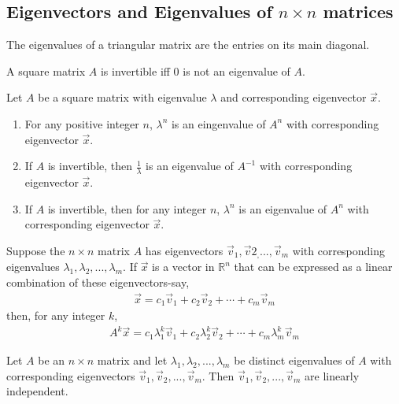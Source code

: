 \documentclass{article}
\begin{document}
\subsection{Eigenvectors and Eigenvalues of $n\times n$ matrices}
\setcounter{theorem}{14}
\begin{theorem}
	The eigenvalues of a triangular matrix are the entries on its main diagonal.
\end{theorem}
\begin{theorem}
	A square matrix $A$ is invertible iff $0$ is not an eigenvalue of $A$.
\end{theorem}
\setcounter{theorem}{17}
\begin{theorem}
	Let $A$ be a square matrix with eigenvalue $\lambda$ and corresponding eigenvector $\vec x$.
	\begin{enumerate}
		\item For any positive integer $n$, $\lambda^n$ is an eingenvalue of $A^n$ with corresponding eigenvector $\vec x$.
		\item If $A$ is invertible, then $\frac{1}{\lambda}$ is an eigenvalue of $A^{-1}$ with corresponding eigenvector $\vec x$.
		\item If $A$ is invertible, then for any integer $n$, $\lambda^n$ is an eigenvalue of $A^n$ with corresponding eigenvector $\vec x$.
	\end{enumerate}
\end{theorem}
\begin{theorem}
	Suppose the $n\times n$ matrix $A$ has eigenvectors $\vec v_1, \vec v2_, ..., \vec v_m$ with corresponding eigenvalues $\lambda_1, \lambda_2, ...,\lambda_m$. If $\vec x$ is a vector in $\mathbb{R}^n$ that can be expressed as a linear combination of these eigenvectors-say,
	\begin{align*}
		\vec x = c_1\vec v_1+c_2\vec v_2 +\cdots + c_m\vec v_m
	\end{align*}
	then, for any integer $k$,
	\begin{align*}
		A^k\vec x = c_1\lambda_1^k\vec v_1+c_2\lambda_2^k\vec v_2 + \cdots + c_m\lambda_m^k\vec v_m
	\end{align*}
\end{theorem}
\begin{theorem}
	Let $A$ be an $n\times n$ matrix and let $\lambda_1, \lambda_2, ...,\lambda_m$ be distinct eigenvalues of $A$ with corresponding eigenvectors $\vec v_1, \vec v_2, ..., \vec v_m$. Then $\vec v_1, \vec v_2, ...,\vec v_m$ are linearly independent.
\end{theorem}
\end{document}
